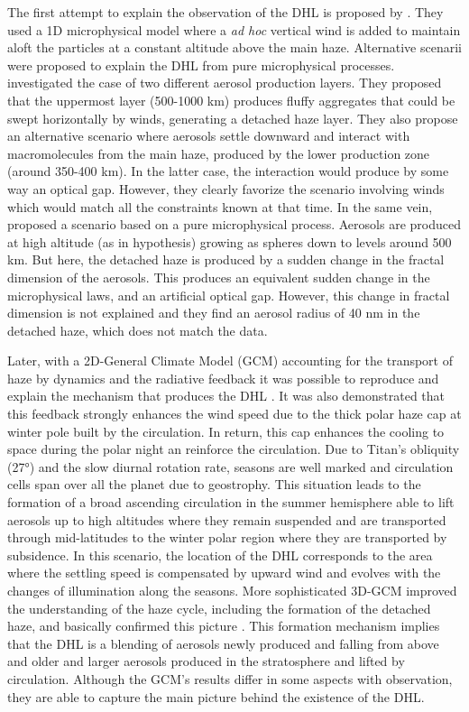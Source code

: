The first attempt to explain the observation of the DHL is proposed by \cite{Toon1992}. They used a 1D microphysical
model where a {\em ad hoc} vertical wind is added to maintain aloft the particles at a constant altitude above the main
haze. Alternative scenarii were proposed to explain the DHL from pure microphysical processes. \cite{Chassefiere1995}
investigated the case of two different aerosol production layers. They proposed that the uppermost layer (500-1000 km)
produces fluffy aggregates that could be swept horizontally by winds, generating a detached haze layer. They also
propose an alternative scenario where aerosols settle downward and interact with macromolecules from the main haze,
produced by the lower production zone (around 350-400 km). In the latter case, the interaction would produce by some
way an optical gap. However, they clearly favorize the scenario involving winds which would match all the constraints
known at that time. In the same vein, \cite{Lavvas2009} proposed a scenario based on a pure microphysical process. Aerosols
are produced at high altitude (as in \cite{Chassefiere1995} hypothesis) growing as spheres down to levels around 500 km.
But here, the detached haze is produced by a sudden change in the fractal dimension of the aerosols. This produces an
equivalent sudden change in the microphysical laws, and an artificial optical gap. However, this change in fractal
dimension is not explained and they find an aerosol radius of 40 nm in the detached haze, which does not match the data.

Later, with a 2D-General Climate Model (GCM) accounting for the transport of haze by dynamics and the radiative
feedback it was possible to reproduce and explain the mechanism that produces the DHL \citep{Rannou2002}. It was also
demonstrated that this feedback strongly enhances the wind speed due to the thick polar haze cap at winter pole built
by the circulation. In return, this cap enhances the cooling to space during the polar night \citep{Rannou2004} an
reinforce the circulation. Due to Titan's obliquity (\ang{27}) and the slow diurnal rotation rate, seasons are well
marked and circulation cells span over all the planet due to geostrophy. This situation leads to the formation of a
broad ascending circulation in the summer hemisphere able to lift aerosols up to high altitudes where they remain
suspended and are transported through  mid-latitudes to the winter polar region where they are transported by
subsidence. In this scenario, the location of the DHL corresponds to the area where the settling speed is compensated
by upward wind and evolves with the changes of illumination along the seasons. More sophisticated 3D-GCM improved the
understanding of the haze cycle, including the formation of the detached haze, and basically confirmed this picture
\citep{Lebonnois2012,Larson2015}. This formation mechanism implies that the DHL is a blending of aerosols newly
produced and falling from above and older and larger aerosols produced in the stratosphere and lifted by circulation.
Although the GCM's results differ in some aspects with observation, they are able to capture the main picture behind
the existence of the DHL.

